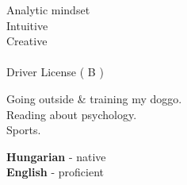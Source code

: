 \documentclass[9pt]{developercv}
\begin{document}

\begin{minipage}[t]{0.3\textwidth}
	\vspace{-\baselineskip} %

	
    Analytic mindset \\ Intuitive \\  Creative \\ \\ Driver License ( B )
\end{minipage}
\hfill
\begin{minipage}[t]{0.3\textwidth}
	\vspace{-\baselineskip} %
	
	
	Going outside \& training my doggo.   \\ Reading about psychology. \\ Sports.
\end{minipage}
\hfill
\begin{minipage}[t]{0.3\textwidth}
	\vspace{-\baselineskip} %
	
	
	
	\textbf{Hungarian} - native\\
	\textbf{English} - proficient\\
	
	
\end{minipage}

\end{document}

